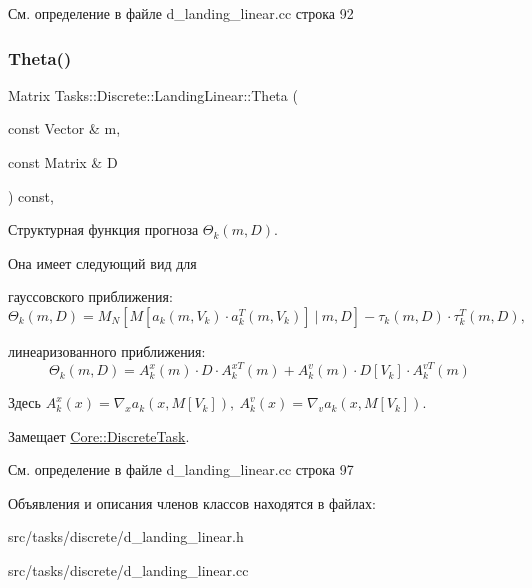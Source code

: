 См. определение в файле d\+\_\+landing\+\_\+linear.\+cc строка 92

\hypertarget{class_tasks_1_1_discrete_1_1_landing_linear_a88dda707914dea5698748f445563400f}{}\label{class_tasks_1_1_discrete_1_1_landing_linear_a88dda707914dea5698748f445563400f} 
\subsubsection{\texorpdfstring{Theta()}{Theta()}}
{\footnotesize\ttfamily Matrix Tasks\+::\+Discrete\+::\+Landing\+Linear\+::\+Theta (\begin{DoxyParamCaption}\item[{const Vector \&}]{m,  }\item[{const Matrix \&}]{D }\end{DoxyParamCaption}) const\hspace{0.3cm}{\ttfamily [override]}, {\ttfamily [virtual]}}



Структурная функция прогноза $\Theta_k(m, D)$. 

Она имеет следующий вид для


\begin{DoxyItemize}
\item гауссовского приближения\+: \[\Theta_k(m, D) = M_N[M[a_k(m, V_k)\cdot a_k^T(m, V_k)]\ |\ m, D] - \tau_k(m,D) \cdot \tau_k^T(m, D),\]
\item линеаризованного приближения\+: \[\Theta_k(m, D) = A_k^x(m) \cdot D \cdot A_k^{xT}(m) + A_k^v(m) \cdot D[V_k] \cdot A_k^{v T}(m)\]
\end{DoxyItemize}

Здесь $A_k^x(x) = \nabla_x a_k(x,M[V_k]),\ A_k^v(x) = \nabla_v a_k(x,M[V_k])$. 

Замещает \hyperlink{class_core_1_1_discrete_task_a18906155257c5febd937f2f0c633e5ed}{Core\+::\+Discrete\+Task}.



См. определение в файле d\+\_\+landing\+\_\+linear.\+cc строка 97



Объявления и описания членов классов находятся в файлах\+:\begin{DoxyCompactItemize}
\item 
src/tasks/discrete/d\+\_\+landing\+\_\+linear.\+h\item 
src/tasks/discrete/d\+\_\+landing\+\_\+linear.\+cc\end{DoxyCompactItemize}
